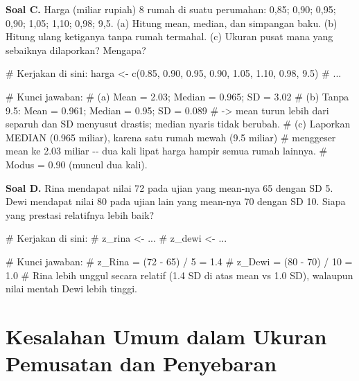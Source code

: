 \documentclass[
  indonesian,
  letterpaper,
]{book}
\newenvironment{Shaded}{\begin{snugshade}}{\end{snugshade}}
\newcommand{\CommentTok}[1]{\textcolor[rgb]{0.37,0.37,0.37}{#1}}
\newcommand{\FloatTok}[1]{\textcolor[rgb]{0.68,0.00,0.00}{#1}}
\newcommand{\FunctionTok}[1]{\textcolor[rgb]{0.28,0.35,0.67}{#1}}
\newcommand{\NormalTok}[1]{\textcolor[rgb]{0.00,0.23,0.31}{#1}}
\newcommand{\OtherTok}[1]{\textcolor[rgb]{0.00,0.23,0.31}{#1}}
\begin{document}
\textbf{Soal C.} Harga (miliar rupiah) 8 rumah di suatu perumahan: 0,85;
0,90; 0,95; 0,90; 1,05; 1,10; 0,98; 9,5. (a) Hitung mean, median, dan
simpangan baku. (b) Hitung ulang ketiganya tanpa rumah termahal. (c)
Ukuran pusat mana yang sebaiknya dilaporkan? Mengapa?

\begin{Shaded}
\begin{Highlighting}[]
\CommentTok{\# Kerjakan di sini:}
\NormalTok{harga }\OtherTok{\textless{}{-}} \FunctionTok{c}\NormalTok{(}\FloatTok{0.85}\NormalTok{, }\FloatTok{0.90}\NormalTok{, }\FloatTok{0.95}\NormalTok{, }\FloatTok{0.90}\NormalTok{, }\FloatTok{1.05}\NormalTok{, }\FloatTok{1.10}\NormalTok{, }\FloatTok{0.98}\NormalTok{, }\FloatTok{9.5}\NormalTok{)}
\CommentTok{\# ...}

\CommentTok{\# Kunci jawaban:}
\CommentTok{\# (a) Mean = 2.03; Median = 0.965; SD = 3.02}
\CommentTok{\# (b) Tanpa 9.5: Mean = 0.961; Median = 0.95; SD = 0.089}
\CommentTok{\#     {-}\textgreater{} mean turun lebih dari separuh dan SD menyusut drastis; median nyaris tidak berubah.}
\CommentTok{\# (c) Laporkan MEDIAN (0.965 miliar), karena satu rumah mewah (9.5 miliar)}
\CommentTok{\#     menggeser mean ke 2.03 miliar {-}{-} dua kali lipat harga hampir semua rumah lainnya.}
\CommentTok{\# Modus = 0.90 (muncul dua kali).}
\end{Highlighting}
\end{Shaded}

\textbf{Soal D.} Rina mendapat nilai 72 pada ujian yang mean-nya 65
dengan SD 5. Dewi mendapat nilai 80 pada ujian lain yang mean-nya 70
dengan SD 10. Siapa yang prestasi relatifnya lebih baik?

\begin{Shaded}
\begin{Highlighting}[]
\CommentTok{\# Kerjakan di sini:}
\CommentTok{\# z\_rina \textless{}{-} ...}
\CommentTok{\# z\_dewi \textless{}{-} ...}

\CommentTok{\# Kunci jawaban:}
\CommentTok{\# z\_Rina = (72 {-} 65) / 5 = 1.4}
\CommentTok{\# z\_Dewi = (80 {-} 70) / 10 = 1.0}
\CommentTok{\# Rina lebih unggul secara relatif (1.4 SD di atas mean vs 1.0 SD), walaupun nilai mentah Dewi lebih tinggi.}
\end{Highlighting}
\end{Shaded}

\section{Kesalahan Umum dalam Ukuran Pemusatan dan
Penyebaran}\label{kesalahan-umum-dalam-ukuran-pemusatan-dan-penyebaran}
\end{document}

